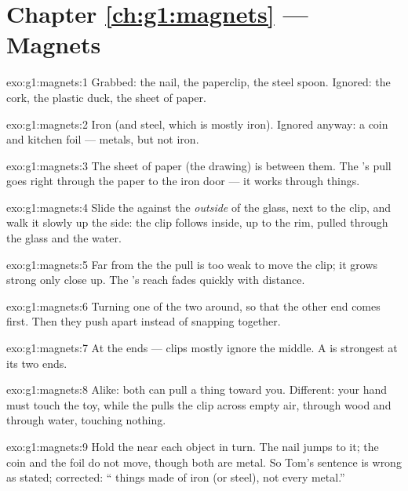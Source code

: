 \section*{Chapter \ref{ch:g1:magnets} --- Magnets}

\begin{solution}{exo:g1:magnets:1}
Grabbed: the nail, the paperclip, the steel spoon. Ignored: the cork,
the plastic duck, the sheet of paper.
\end{solution}

\begin{solution}{exo:g1:magnets:2}
Iron (and steel, which is mostly iron). Ignored anyway: a coin and
kitchen foil --- metals, but not iron.
\end{solution}

\begin{solution}{exo:g1:magnets:3}
The sheet of paper (the drawing) is between them. The 's pull
goes right through the paper to the iron door --- it works through
things.
\end{solution}

\begin{solution}{exo:g1:magnets:4}
Slide the  against the \emph{outside} of the glass, next to the
clip, and walk it slowly up the side: the clip follows inside, up to
the rim, pulled through the glass and the water.
\end{solution}

\begin{solution}{exo:g1:magnets:5}
Far from the  the pull is too weak to move the clip; it grows
strong only close up. The 's reach fades quickly with distance.
\end{solution}

\begin{solution}{exo:g1:magnets:6}
Turning one of the two  around, so that the other end comes
first. Then they push apart instead of snapping together.
\end{solution}

\begin{solution}{exo:g1:magnets:7}
At the ends --- clips mostly ignore the middle. A  is strongest
at its two ends.
\end{solution}

\begin{solution}{exo:g1:magnets:8}
Alike: both can pull a thing toward you. Different: your hand must
touch the toy, while the  pulls the clip across empty air,
through wood and through water, touching nothing.
\end{solution}

\begin{solution}{exo:g1:magnets:9}
Hold the  near each object in turn. The nail jumps to it; the
coin and the foil do not move, though both are metal. So Tom's
sentence is wrong as stated; corrected: ``  things made
of iron (or steel), not every metal.''
\end{solution}
